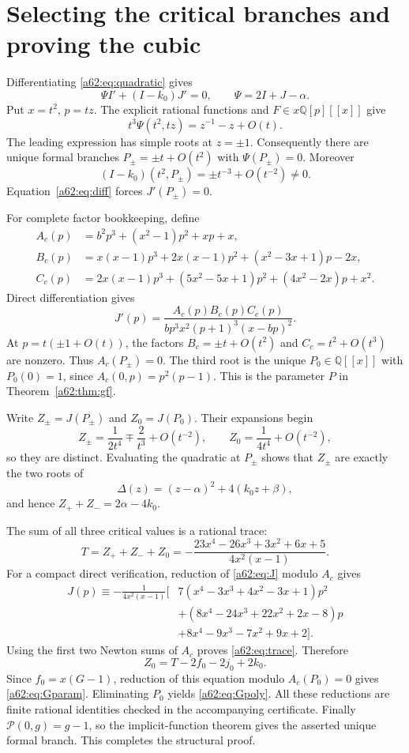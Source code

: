 \documentclass[11pt,letterpaper]{article}
\theoremstyle{remark}\newtheorem{remark}[theorem]{Remark}
\newcommand{\Q}{\mathbb Q}
\begin{document}
\section{Selecting the critical branches and proving the cubic}\label{a62:sec:cubic}
Differentiating \eqref{a62:eq:quadratic} gives
\begin{equation}\label{a62:eq:diff}
 \Psi I'+(I-k_0)J'=0,\qquad \Psi=2I+J-\alpha.
\end{equation}
Put $x=t^2$, $p=tz$. The explicit rational functions and $F\in x\Q[p][[x]]$ give
\[
 t^3\Psi(t^2,tz)=z^{-1}-z+O(t).
\]
The leading expression has simple roots at $z=\pm1$. Consequently there are unique formal branches $P_\pm=\pm t+O(t^2)$ with $\Psi(P_\pm)=0$. Moreover
\[
 (I-k_0)(t^2,P_\pm)=\pm t^{-3}+O(t^{-2})\ne0.
\]
Equation~\eqref{a62:eq:diff} forces $J'(P_\pm)=0$.

For complete factor bookkeeping, define
\begin{align*}
 A_c(p)&=b^2p^3+(x^2-1)p^2+xp+x,\\
 B_c(p)&=x(x-1)p^3+2x(x-1)p^2+(x^2-3x+1)p-2x,\\
 C_c(p)&=2x(x-1)p^3+(5x^2-5x+1)p^2+(4x^2-2x)p+x^2.
\end{align*}
Direct differentiation gives
\[
 J'(p)=\frac{A_c(p)B_c(p)C_c(p)}{bp^3x^2(p+1)^3(x-bp)^2}.
\]
At $p=t(\pm1+O(t))$, the factors $B_c=\pm t+O(t^2)$ and $C_c=t^2+O(t^3)$ are nonzero. Thus $A_c(P_\pm)=0$. The third root is the unique $P_0\in\Q[[x]]$ with $P_0(0)=1$, since $A_c(0,p)=p^2(p-1)$. This is the parameter $P$ in Theorem~\ref{a62:thm:gf}.

Write $Z_\pm=J(P_\pm)$ and $Z_0=J(P_0)$. Their expansions begin
\[
 Z_\pm=\frac1{2t^4}\mp\frac2{t^3}+O(t^{-2}),\qquad
 Z_0=\frac1{4t^4}+O(t^{-2}),
\]
so they are distinct. Evaluating the quadratic at $P_\pm$ shows that $Z_\pm$ are exactly the two roots of
\[
 \Delta(z)=(z-\alpha)^2+4(k_0z+\beta),
\]
and hence $Z_++Z_-=2\alpha-4k_0$.

The sum of all three critical values is a rational trace:
\begin{equation}\label{a62:eq:trace}
 T=Z_++Z_-+Z_0=-\frac{23x^4-26x^3+3x^2+6x+5}{4x^2(x-1)}.
\end{equation}
For a compact direct verification, reduction of \eqref{a62:eq:J} modulo $A_c$ gives
\begin{align*}
J(p)\equiv-\frac{1}{4x^2(x-1)}\big[&
7(x^4-3x^3+4x^2-3x+1)p^2\\
&+(8x^4-24x^3+22x^2+2x-8)p\\
&+8x^4-9x^3-7x^2+9x+2\big].
\end{align*}
Using the first two Newton sums of $A_c$ proves \eqref{a62:eq:trace}. Therefore
\[
 Z_0=T-2f_0-2j_0+2k_0.
\]
Since $f_0=x(G-1)$, reduction of this equation modulo $A_c(P_0)=0$ gives \eqref{a62:eq:Gparam}. Eliminating $P_0$ yields \eqref{a62:eq:Gpoly}. All these reductions are finite rational identities checked in the accompanying certificate. Finally $\mathcal P(0,g)=g-1$, so the implicit-function theorem gives the asserted unique formal branch. This completes the structural proof.
\end{document}
